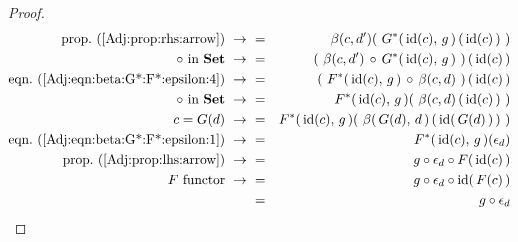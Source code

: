 \begin{proof}
\begin{eqnarray*}
            \mbox{prop.~(\ref{Adj:prop:rhs:arrow})}\ \to\ 
            &=&\beta(c,d')(\ G^{*}(\,\id(c),\, g\,)\,(\,\id(c)\,)\ )\\
            \mbox{$\circ$ in \Set}\ \to\ 
            &=&(\ \beta(c,d')\,\circ\,G^{*}(\,\id(c),\, g\,)\ )\,(\,\id(c)\,)\\
            \mbox{eqn.~(\ref{Adj:eqn:beta:G*:F*:epsilon:4})}\ \to\ 
            &=&(\ F^{*}(\,\id(c),\,g\,)\,\circ\,\beta(c,d)\ )\,(\,\id(c)\,)\\
            \mbox{$\circ$ in \Set}\ \to\ 
            &=&F^{*}(\,\id(c),\,g\,)(\ \beta(c,d)\,(\,\id(c)\,)\ )\\
            \mbox{$c=G(d)$}\ \to\ 
            &=&F^{*}(\,\id(c),\,g\,)(\ \beta(\,G(d),\,d\,)\,(\,\id(\,G(d)\,)\,)\ )\\
            \mbox{eqn.~(\ref{Adj:eqn:beta:G*:F*:epsilon:1})}\ \to\ 
            &=&F^{*}(\,\id(c),\,g\,)(\epsilon_{d})\\
            \mbox{prop.~(\ref{Adj:prop:lhs:arrow})}\ \to\ 
            &=&g\circ\epsilon_{d}\circ F(\,\id(c)\,)\\
            \mbox{$F$ functor}\ \to\ 
            &=&g\circ\epsilon_{d}\circ\id(\,F(c)\,)\\
            &=&g\circ\epsilon_{d}
        \end{eqnarray*}
\end{proof}

